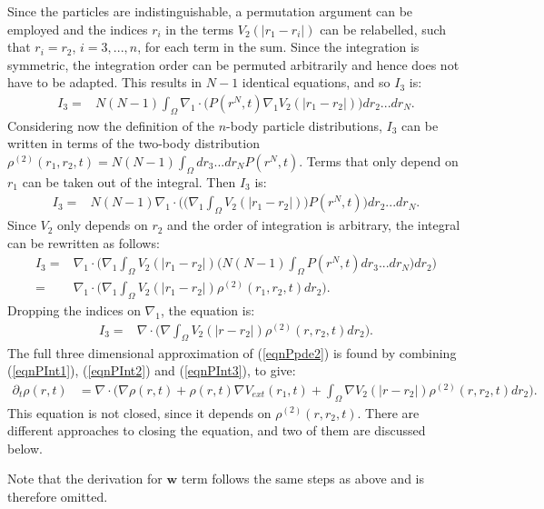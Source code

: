 Since the particles are indistinguishable, a permutation argument can be employed and the indices $r_i$ in the terms $V_2(|r_1 - r_i|)$ can be relabelled, such that $r_i=r_2$, $i=3,...,n$, for each term in the sum. Since the integration is symmetric, the integration order can be permuted arbitrarily and hence does not have to be adapted. This results in $N-1$ identical equations, and so $I_3$ is:
\begin{align*}
 I_3 
 =& N(N-1) \int_\Omega  \nabla_1 \cdot \bigg( P(r^N,t)\nabla_1 V_2(|r_1 - r_2|) \bigg) dr_2...dr_N.
\end{align*}
Considering now the definition of the $n$-body particle distributions, $I_3$ can be written in terms of the two-body distribution $\rho^{(2)}(r_1,r_2,t)= N(N-1) \int_\Omega dr_3...dr_N P(r^N,t)$. Terms that only depend on $r_1$ can be taken out of the integral. Then $I_3$ is:
\begin{align*}
I_3 
=& N(N-1)  \nabla_1 \cdot \bigg( \bigg(\nabla_1 \int_\Omega  V_2(|r_1 - r_2|) \bigg) P(r^N,t) \bigg) dr_2...dr_N.
\end{align*}
Since $V_2$ only depends on $r_2$ and the order of integration is arbitrary, the integral can be rewritten as follows:
\begin{align*}
I_3 
=&  \nabla_1 \cdot \bigg( \nabla_1 \int_\Omega  V_2(|r_1 - r_2|) \bigg(N(N-1) \int_\Omega  P(r^N,t)  dr_3...dr_N \bigg) dr_2 \bigg)\\
=&  \nabla_1 \cdot \bigg( \nabla_1 \int_\Omega  V_2(|r_1 - r_2|) \rho^{(2)}(r_1,r_2,t) dr_2 \bigg).
\end{align*}
Dropping the indices on $\nabla_1$, the equation is:
\begin{align} \label{eqnPInt3}
I_3 
=&  \nabla\cdot \bigg( \nabla \int_\Omega  V_2(|r - r_2|) \rho^{(2)}(r,r_2,t) dr_2 \bigg).
\end{align}
The full three dimensional approximation of (\ref{eqnPpde2}) is found by combining (\ref{eqnPInt1}), (\ref{eqnPInt2}) and (\ref{eqnPInt3}), to give:
\begin{align*}
\partial_t \rho(r,t) &=
 \nabla\cdot \bigg(\nabla \rho(r,t)
+ \rho(r,t)\nabla V_{ext}(r_1,t) 
+ \int_\Omega \nabla  V_2(|r - r_2|) \rho^{(2)}(r,r_2,t) dr_2 \bigg).
\end{align*}
This equation is not closed, since it depends on $\rho^{(2)}(r,r_2,t)$. 
There are different approaches to closing the equation, and two of them are discussed below.

Note that the derivation for $\mathbf{w}$ term follows the same steps as above and is therefore omitted.
